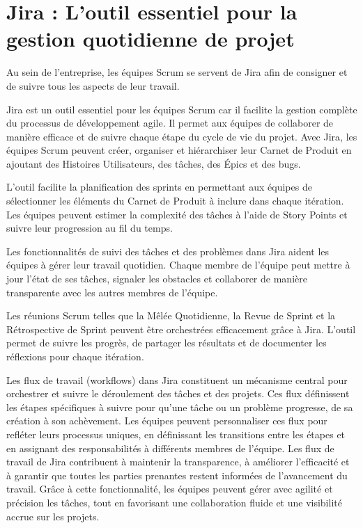 \section[Jira : L'outil essentiel pour la gestion de projet]{Jira : L'outil essentiel pour la gestion quotidienne de projet}\label{sec:jira}

Au sein de l'entreprise, les équipes Scrum se servent de Jira afin de consigner et de suivre tous les aspects de leur travail.

Jira est un outil essentiel pour les équipes Scrum car il facilite la gestion complète du processus de développement agile. Il permet aux équipes de collaborer de manière efficace et de suivre chaque étape du cycle de vie du projet. Avec Jira, les équipes Scrum peuvent créer, organiser et hiérarchiser leur Carnet de Produit en ajoutant des Histoires Utilisateurs, des tâches, des Épics et des bugs.

L'outil facilite la planification des sprints en permettant aux équipes de sélectionner les éléments du Carnet de Produit à inclure dans chaque itération. Les équipes peuvent estimer la complexité des tâches à l'aide de Story Points et suivre leur progression au fil du temps.

Les fonctionnalités de suivi des tâches et des problèmes dans Jira aident les équipes à gérer leur travail quotidien. Chaque membre de l'équipe peut mettre à jour l'état de ses tâches, signaler les obstacles et collaborer de manière transparente avec les autres membres de l'équipe.

Les réunions Scrum telles que la Mêlée Quotidienne, la Revue de Sprint et la Rétrospective de Sprint peuvent être orchestrées efficacement grâce à Jira. L'outil permet de suivre les progrès, de partager les résultats et de documenter les réflexions pour chaque itération.

Les flux de travail (workflows) dans Jira constituent un mécanisme central pour orchestrer et suivre le déroulement des tâches et des projets. Ces flux définissent les étapes spécifiques à suivre pour qu'une tâche ou un problème progresse, de sa création à son achèvement. Les équipes peuvent personnaliser ces flux pour refléter leurs processus uniques, en définissant les transitions entre les étapes et en assignant des responsabilités à différents membres de l'équipe. Les flux de travail de Jira contribuent à maintenir la transparence, à améliorer l'efficacité et à garantir que toutes les parties prenantes restent informées de l'avancement du travail. Grâce à cette fonctionnalité, les équipes peuvent gérer avec agilité et précision les tâches, tout en favorisant une collaboration fluide et une visibilité accrue sur les projets.

